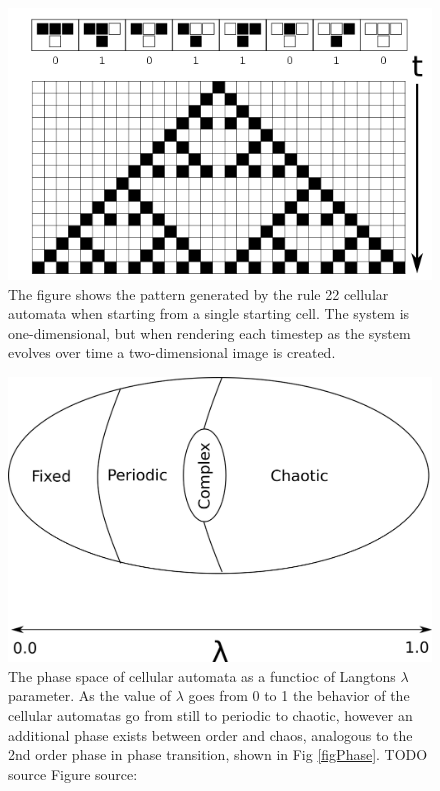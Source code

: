 \begin{figure}[h!]
  \centering
  \includegraphics[width=1\textwidth]{fig/ca22t.png}
  \caption{
    The figure shows the pattern generated by the rule 22 cellular automata when
    starting from a single starting cell.
    The system is one-dimensional, but when rendering each timestep as the
    system evolves over time a two-dimensional image is created.
  }
  \label{figCA22}
\end{figure}
\begin{figure}[h!]
  \centering
  \includegraphics[width=1\textwidth]{fig/egg.png}
  \caption{
    The phase space of cellular automata as a functioc of Langtons $λ$
    parameter.
    As the value of $λ$ goes from 0 to 1 the behavior of the cellular automatas
    go from still to periodic to chaotic, however an additional phase exists
    between order and chaos, analogous to the 2nd order phase in phase
    transition, shown in Fig \ref{figPhase}.
    TODO source
    Figure source: 
  }
  \label{figCAegg}
\end{figure}
